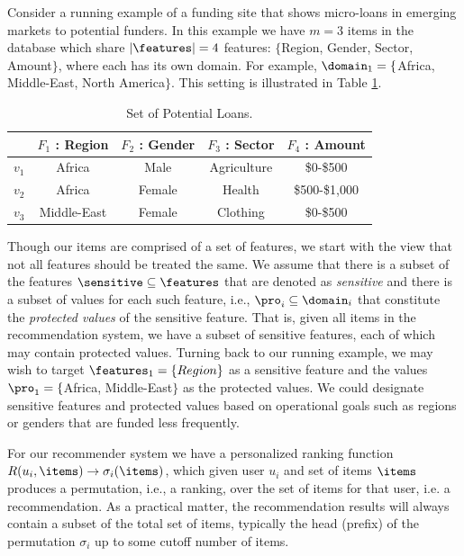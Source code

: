 Consider a running example of a funding site that shows micro-loans in emerging markets to potential funders. In this example we have $m=3$ items in the database which share $|\features|=4$ features: $\{$Region, Gender, Sector, Amount$\}$, where each has its own domain.  For example, $\domain_1 = \{$Africa, Middle-East, North America$\}$.  This setting is illustrated in Table \ref{table:user_profile}.
    
\begin{table}
    \centering
    \begin{tabular}{|c|c|c|c|c|}
    \hline
            & $F_{1}$ : Region & $F_{2}$ : Gender & $F_{3}$ : Sector & $F_{4}$ : Amount \\
    \hline
        $v_1$ & Africa & Male & Agriculture & \$0-\$500\\
    \hline
        $v_2$ & Africa & Female & Health & \$500-\$1,000\\
    \hline
        $v_3$ & Middle-East & Female & Clothing & \$0-\$500 \\
    \hline
    \end{tabular}
    \caption{Set of Potential Loans.}
    \label{table:user_profile}
\end{table}

Though our items are comprised of a set of features, we start with the view that not all features should be treated the same. We assume that there is a subset of the features $\sensitive \subseteq \features$ that are denoted as \textit{sensitive} and there is a subset of values for each such feature, i.e., $\pro_i \subseteq \domain_i$ that constitute the \emph{protected values} of the sensitive feature. That is, given all items in the recommendation system, we have a subset of sensitive features, each of which may contain protected values. Turning back to our running example, we may wish to target $\features_1=\{Region\}$ as a sensitive feature and the values $\pro_1=\{$Africa, Middle-East$\}$ as the protected values. We could designate sensitive features and protected values based on operational goals such as regions or genders that are funded less frequently.

For our recommender system we have a personalized ranking function $R(u_i, \items) \rightarrow \sigma_i(\items)$, which given user $u_i$ and set of items $\items$ produces a permutation, i.e., a ranking, over the set of items for that user, i.e. a recommendation. As a practical matter, the recommendation results will always contain a subset of the total set of items, typically the head (prefix) of the permutation $\sigma_i$ up to some cutoff number of items.

